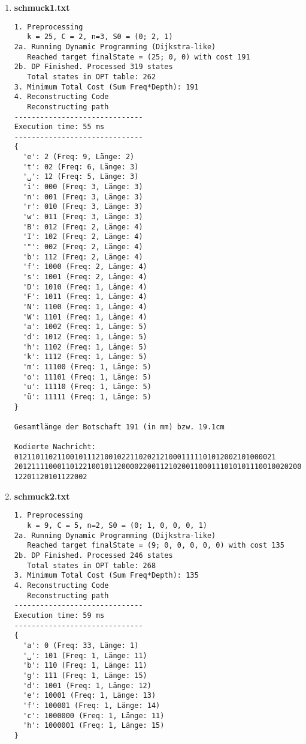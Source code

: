 \documentclass[a4paper,10pt,ngerman]{scrartcl}
\begin{document}
\begin{enumerate}
  \item \textbf{schmuck1.txt}
  \begin{verbatim}
1. Preprocessing
   k = 25, C = 2, n=3, S0 = (0; 2, 1)
2a. Running Dynamic Programming (Dijkstra-like)
   Reached target finalState = (25; 0, 0) with cost 191
2b. DP Finished. Processed 319 states
   Total states in OPT table: 262
3. Minimum Total Cost (Sum Freq*Depth): 191
4. Reconstructing Code
   Reconstructing path
------------------------------
Execution time: 55 ms
------------------------------
{
  'e': 2 (Freq: 9, Länge: 2)
  't': 02 (Freq: 6, Länge: 3)
  '␣': 12 (Freq: 5, Länge: 3)
  'i': 000 (Freq: 3, Länge: 3)
  'n': 001 (Freq: 3, Länge: 3)
  'r': 010 (Freq: 3, Länge: 3)
  'w': 011 (Freq: 3, Länge: 3)
  'B': 012 (Freq: 2, Länge: 4)
  'I': 102 (Freq: 2, Länge: 4)
  '"': 002 (Freq: 2, Länge: 4)
  'b': 112 (Freq: 2, Länge: 4)
  'f': 1000 (Freq: 2, Länge: 4)
  's': 1001 (Freq: 2, Länge: 4)
  'D': 1010 (Freq: 1, Länge: 4)
  'F': 1011 (Freq: 1, Länge: 4)
  'N': 1100 (Freq: 1, Länge: 4)
  'W': 1101 (Freq: 1, Länge: 4)
  'a': 1002 (Freq: 1, Länge: 5)
  'd': 1012 (Freq: 1, Länge: 5)
  'h': 1102 (Freq: 1, Länge: 5)
  'k': 1112 (Freq: 1, Länge: 5)
  'm': 11100 (Freq: 1, Länge: 5)
  'o': 11101 (Freq: 1, Länge: 5)
  'u': 11110 (Freq: 1, Länge: 5)
  'ü': 11111 (Freq: 1, Länge: 5)
}

Gesamtlänge der Botschaft 191 (in mm) bzw. 19.1cm

Kodierte Nachricht: 0121101102110010111210010221102021210001111101012002101000021
201211110001101221001011200002200112102001100011101010111001002020001112011202021
12201120101122002
  \end{verbatim}
  \item \textbf{schmuck2.txt}
  \begin{verbatim}
1. Preprocessing
   k = 9, C = 5, n=2, S0 = (0; 1, 0, 0, 0, 1)
2a. Running Dynamic Programming (Dijkstra-like)
   Reached target finalState = (9; 0, 0, 0, 0, 0) with cost 135
2b. DP Finished. Processed 246 states
   Total states in OPT table: 268
3. Minimum Total Cost (Sum Freq*Depth): 135
4. Reconstructing Code
   Reconstructing path
------------------------------
Execution time: 59 ms
------------------------------
{
  'a': 0 (Freq: 33, Länge: 1)
  '␣': 101 (Freq: 1, Länge: 11)
  'b': 110 (Freq: 1, Länge: 11)
  'g': 111 (Freq: 1, Länge: 15)
  'd': 1001 (Freq: 1, Länge: 12)
  'e': 10001 (Freq: 1, Länge: 13)
  'f': 100001 (Freq: 1, Länge: 14)
  'c': 1000000 (Freq: 1, Länge: 11)
  'h': 1000001 (Freq: 1, Länge: 15)
}


\end{verbatim}
\end{enumerate}
\end{document}
